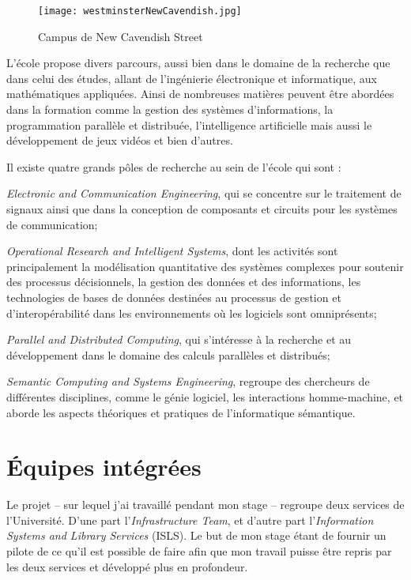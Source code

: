 \begin{figure}[!ht]
	\centering
	\texttt{[image: westminsterNewCavendish.jpg]}
	\caption{Campus de New Cavendish Street}
	\label{figure:westminsterNewCavendish}

\end{figure}

L'\'ecole propose divers parcours, aussi bien dans le domaine de la recherche que dans celui des \'etudes, allant de l'ing\'enierie \'electronique et informatique, aux math\'ematiques appliqu\'ees.
Ainsi de nombreuses mati\`eres peuvent \^etre abord\'ees dans la formation comme la gestion des syst\`emes d'informations, la programmation parall\`ele et distribu\'ee, l'intelligence artificielle mais aussi le d\'eveloppement de jeux vid\'eos et bien d'autres.

\noindent Il existe quatre grands p\^oles de recherche au sein de l'\'ecole qui sont :

\textit{Electronic and Communication Engineering}, qui se concentre sur le traitement de signaux ainsi que dans la conception de composants et circuits pour les syst\`emes de communication;

\textit{Operational Research and Intelligent Systems}, dont les activit\'es sont principalement la mod\'elisation quantitative des syst\`emes complexes pour soutenir des processus d\'ecisionnels, la gestion des donn\'ees et des informations, les technologies de bases de donn\'ees destin\'ees au processus de gestion et d'interop\'erabilit\'e dans les environnements o\`u les logiciels sont omnipr\'esents;

\textit{Parallel and Distributed Computing}, qui s'int\'eresse \`a la recherche et au d\'eveloppement dans le domaine des calculs parall\`eles et distribu\'es;

\textit{Semantic Computing and Systems Engineering}, regroupe des chercheurs de diff\'erentes disciplines, comme le g\'enie logiciel, les interactions homme-machine, et aborde les aspects th\'eoriques et pratiques de l'informatique s\'emantique.

\section{\'Equipes int\'egr\'ees}

Le projet {\YuukouII} -- sur lequel j'ai travaill\'e pendant mon stage -- regroupe deux services de l'Universit\'e. 
D'une part l'\textit{Infrastructure Team}, et d'autre part l'\textit{Information Systems and Library Services} (ISLS).
Le but de mon stage \'etant de fournir un pilote de ce qu'il est possible de faire afin que mon travail puisse \^etre repris par les deux services et d\'evelopp\'e plus en profondeur.

